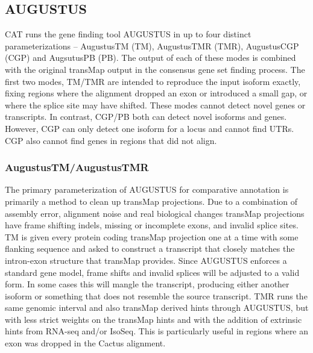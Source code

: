 \documentclass[fleqn,10pt]{wlscirep}
\begin{document}
\subsection*{AUGUSTUS}
	CAT runs the gene finding tool AUGUSTUS in up to four distinct parameterizations -- AugustusTM (TM), AugustusTMR (TMR), AugustusCGP (CGP) and AugsutusPB (PB). The output of each of these modes is combined with the original transMap output in the consensus gene set finding process. The first two modes, TM/TMR are intended to reproduce the input isoform exactly, fixing regions where the alignment dropped an exon or introduced a small gap, or where the splice site may have shifted. These modes cannot detect novel genes or transcripts. In contrast, CGP/PB both can detect novel isoforms and genes. However, CGP can only detect one isoform for a locus and cannot find UTRs. CGP also cannot find genes in regions that did not align. 
    
\subsubsection*{AugustusTM/AugustusTMR}
	The primary parameterization of AUGUSTUS for comparative annotation is primarily a method to clean up transMap projections. Due to a combination of assembly error, alignment noise and real biological changes transMap projections have frame shifting indels, missing or incomplete exons, and invalid splice sites. TM is given every protein coding transMap projection one at a time with some flanking sequence and asked to construct a transcript that closely matches the intron-exon structure that transMap provides. Since AUGUSTUS enforces a standard gene model, frame shifts and invalid splices will be adjusted to a valid form. In some cases this will mangle the transcript, producing either another isoform or something that does not resemble the source transcript. TMR runs the same genomic interval and also transMap derived hints through AUGUSTUS, but with less strict weights on the transMap hints and with the addition of extrinsic hints from RNA-seq and/or IsoSeq. This is particularly useful in regions where an exon was dropped in the Cactus alignment.
    
\end{document}
